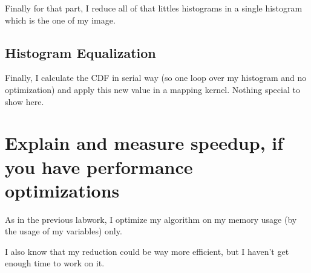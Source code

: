 \documentclass[11pt]{article} %
\begin{document}
Finally for that part, I reduce all of that littles histograms in a single histogram which is the one of my image.

\subsection{Histogram Equalization}

Finally, I calculate the CDF in serial way (so one loop over my histogram and no optimization) and apply this new value in a mapping kernel. Nothing special to show here.

\section{Explain and measure speedup, if you have performance optimizations}

As in the previous labwork, I optimize my algorithm on my memory usage (by the usage of my variables) only.

I also know that my reduction could be way more efficient, but I haven't get enough time to work on it.
\end{document}
